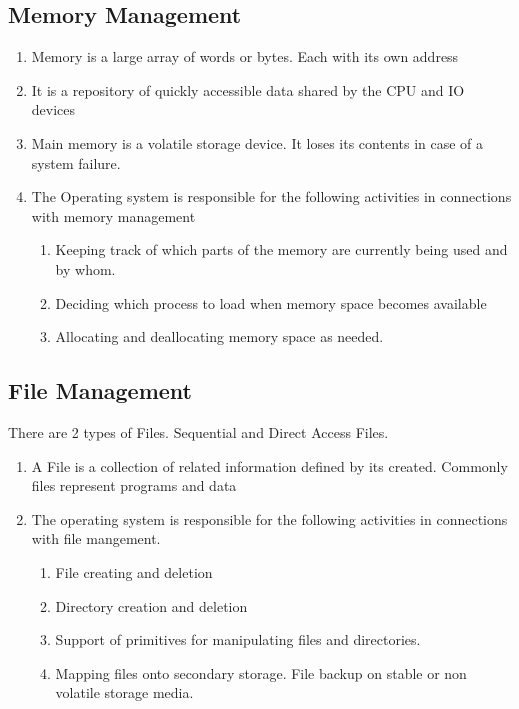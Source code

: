 \documentclass[11pt]{article}
\begin{document}
\subsection{Memory Management}
\begin{enumerate}
	\item Memory is a large array of words or bytes. Each with its own address
	\item It is a repository of quickly accessible data shared by the CPU and IO devices
	\item Main memory is a volatile storage device. It loses its contents in case of a system failure.
	\item The Operating system is responsible for the following activities in connections with memory management
	      \begin{enumerate}
		      \item Keeping track of which parts of the memory are currently being used and by whom.
		      \item Deciding which process to load when memory space becomes available
		      \item Allocating and deallocating memory space as needed.
	      \end{enumerate}


\end{enumerate}
\subsection{File Management}

There are 2 types of Files. Sequential and Direct Access Files.

\begin{enumerate}
	\item A File is a collection of related information defined by its created. Commonly files represent programs and data
	\item The operating system is responsible for the following activities in connections with file mangement.
	      \begin{enumerate}
		      \item File creating and deletion
		      \item Directory creation and deletion
		      \item Support of primitives for manipulating files and directories.
		      \item Mapping files onto secondary storage. File backup on stable or non volatile storage media.
	      \end{enumerate}

\end{enumerate}
\end{document}

